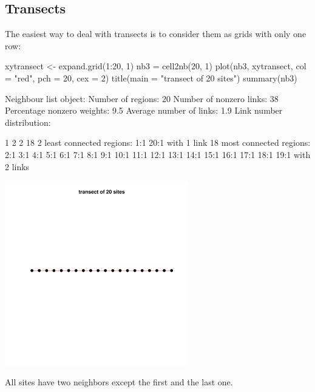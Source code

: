 \documentclass[a4paper]{article}
\begin{document}
\subsection{Transects}
The easiest way to deal with transects is to consider them as grids with only one row:
\begin{Schunk}
\begin{Sinput}
 xytransect <- expand.grid(1:20, 1)
 nb3 = cell2nb(20, 1)
 plot(nb3, xytransect, col = "red", pch = 20, cex = 2)
 title(main = "transect of 20 sites")
 summary(nb3)
\end{Sinput}
\begin{Soutput}
Neighbour list object:
Number of regions: 20 
Number of nonzero links: 38 
Percentage nonzero weights: 9.5 
Average number of links: 1.9 
Link number distribution:

 1  2 
 2 18 
2 least connected regions:
1:1 20:1 with 1 link
18 most connected regions:
2:1 3:1 4:1 5:1 6:1 7:1 8:1 9:1 10:1 11:1 12:1 13:1 14:1 15:1 16:1 17:1 18:1 19:1 with 2 links
\end{Soutput}
\end{Schunk}
\begin{center}
\includegraphics[width=0.6\textwidth,keepaspectratio]{figs/tutorial-ni5}
\end{center}
All sites have two neighbors except the first and the last one.
\end{document}
